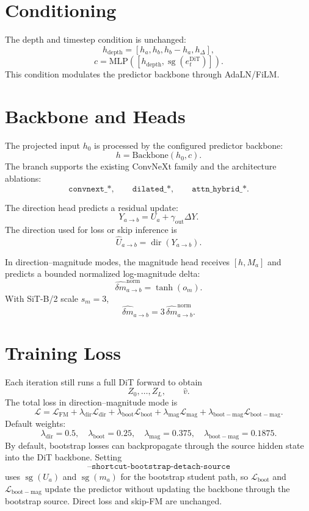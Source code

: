 \documentclass[11pt]{article}
\begin{document}
\section{Conditioning}
The depth and timestep condition is unchanged:
\[
    h_{\mathrm{depth}}=[h_a,h_b,h_b-h_a,h_\Delta],
\]
\[
    c=\mathrm{MLP}\left(
    [h_{\mathrm{depth}},\operatorname{sg}(e_t^{\mathrm{DiT}})]
    \right).
\]
This condition modulates the predictor backbone through AdaLN/FiLM.

\section{Backbone and Heads}
The projected input \(h_0\) is processed by the configured predictor backbone:
\[
    h=\mathrm{Backbone}(h_0,c).
\]
The branch supports the existing ConvNeXt family and the architecture
ablations:
\[
    \texttt{convnext\_*},\qquad
    \texttt{dilated\_*},\qquad
    \texttt{attn\_hybrid\_*}.
\]

The direction head predicts a residual update:
\[
    Y_{a\rightarrow b}=U_a+\gamma_{\mathrm{out}}\Delta Y.
\]
The direction used for loss or skip inference is
\[
    \hat U_{a\rightarrow b}=\operatorname{dir}(Y_{a\rightarrow b}).
\]

In direction--magnitude modes, the magnitude head receives \([h,M_a]\) and
predicts a bounded normalized log-magnitude delta:
\[
    \hat{\delta m}_{a\rightarrow b}^{\mathrm{norm}}=\tanh(o_m).
\]
With SiT-B/2 scale \(s_m=3\),
\[
    \hat{\delta m}_{a\rightarrow b}
    =
    3\,\hat{\delta m}_{a\rightarrow b}^{\mathrm{norm}}.
\]

\section{Training Loss}
Each iteration still runs a full DiT forward to obtain
\[
    Z_0,\ldots,Z_L,\qquad \hat v.
\]
The total loss in direction--magnitude mode is
\[
    \mathcal{L}
    =
    \mathcal{L}_{\mathrm{FM}}
    +\lambda_{\mathrm{dir}}\mathcal{L}_{\mathrm{dir}}
    +\lambda_{\mathrm{boot}}\mathcal{L}_{\mathrm{boot}}
    +\lambda_{\mathrm{mag}}\mathcal{L}_{\mathrm{mag}}
    +\lambda_{\mathrm{boot-mag}}\mathcal{L}_{\mathrm{boot-mag}}.
\]
Default weights:
\[
    \lambda_{\mathrm{dir}}=0.5,\quad
    \lambda_{\mathrm{boot}}=0.25,\quad
    \lambda_{\mathrm{mag}}=0.375,\quad
    \lambda_{\mathrm{boot-mag}}=0.1875.
\]
By default, bootstrap losses can backpropagate through the source hidden state
into the DiT backbone. Setting
\[
    \texttt{--shortcut-bootstrap-detach-source}
\]
uses \(\operatorname{sg}(U_a)\) and \(\operatorname{sg}(m_a)\) for the
bootstrap student path, so \(\mathcal{L}_{\mathrm{boot}}\) and
\(\mathcal{L}_{\mathrm{boot-mag}}\) update the predictor without updating the
backbone through the bootstrap source. Direct loss and skip-FM are unchanged.
\end{document}

